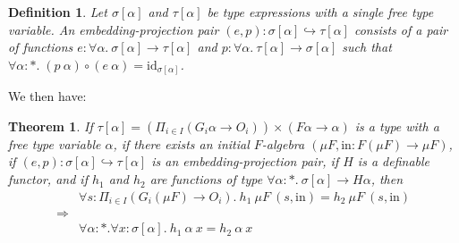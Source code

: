 \documentclass{article}[12 pt]
\newtheorem{thm}{Theorem}
\newtheorem{definition}{Definition}
\theoremstyle{problemstyle}
\begin{document}
\begin{definition}
  Let $\sigma[\alpha]$ and $\tau[\alpha]$ be type expressions with a
  single free type variable. An \emph{embedding-projection pair}
  $(e,p) : \sigma[\alpha] \hookrightarrow \tau[\alpha]$ consists of a
  pair of functions $e : \forall \alpha.~\sigma[\alpha] \to
  \tau[\alpha]$ and $p : \forall \alpha.~\tau[\alpha] \to
  \sigma[\alpha]$ such that $\forall \alpha : *. \; (p~\alpha) \circ
  (e~\alpha) = \mathrm{id}_{\sigma[\alpha]}$.
\end{definition}

\noindent
We then have:

\begin{thm}\label{thm:e-p-reduction}
  If $\tau[\alpha] = (\Pi_{i \in I} (G_i \alpha \to O_i)) \times (F
  \alpha \to \alpha)$ is a type with a free type variable $\alpha$, if
  there exists an initial $F$-algebra $(\mu F, \mathrm{in} : F(\mu F)
  \to \mu F)$, if $(e,p) : \sigma[\alpha] \hookrightarrow
  \tau[\alpha]$ is an embedding-projection pair, if $H$ is a definable
  functor, and if $h_1$ and $h_2$ are functions of type $\forall
  \alpha : *.~\sigma[\alpha] \to H \alpha$, then 
  \begin{displaymath}
    \begin{array}{cl}
      &  \forall s : \Pi_{i \in I}(G_i(\mu F) \to O_i).~h_1~\mu F~(s,
          \mathrm{in}) = h_2~\mu F~(s, \mathrm{in})
      \\
      \Rightarrow& \\
      & \forall \alpha : *. \forall x : \sigma[\alpha].~h_1~\alpha~x =
      h_2~\alpha~x 
    \end{array}
  \end{displaymath}
\end{thm}
\end{document}
